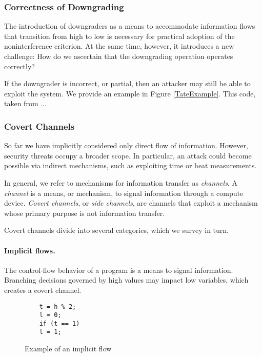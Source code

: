 \subsubsection{Correctness of Downgrading}

The introduction of downgraders as a means to accommodate information flows that transition from high to low is necessary for practical adoption of the noninterference criterion. At the same time, however, it introduces a new challenge: How do we ascertain that the downgrading operation operates correctly?

If the downgrader is incorrect, or partial, then an attacker may still be able to exploit the system. We provide an example in Figure \ref{TateExample}. This code, taken from ...



\subsubsection{Covert Channels}

So far we have implicitly considered only direct flow of information. However, security threats occupy a broader scope. In particular, an attack could become possible via indirect mechanisms, such as exploiting time or heat measurements.

In general, we refer to mechanisms for information transfer as \emph{channels}. A \emph{channel} is a means, or mechanism, to signal information through a compute device. 
\emph{Covert channels}, or \emph{side channels}, are channels that exploit a mechanism whose primary purpose is not information transfer.

Covert channels divide into several categories, which we survey in turn.

\paragraph{Implicit flows.} The control-flow behavior of a program is a means to signal information. Branching decisions governed by high values may impact low variables, which creates a covert channel.

\begin{figure}
	\begin{lstlisting}
	t = h % 2;
	l = 0;
	if (t == 1) 
	l = 1;
	\end{lstlisting}
	\caption{\label{Fi:implicitFlow}Example of an implicit flow}
\end{figure}


